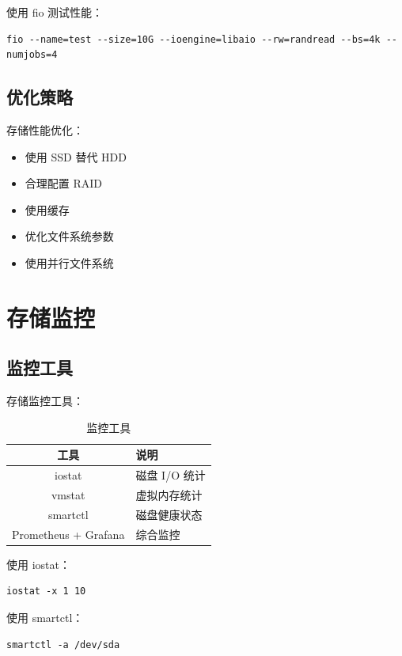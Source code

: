 \documentclass[12pt,UTF8]{ctexbook}
\begin{document}
使用 fio 测试性能：
\begin{verbatim}
fio --name=test --size=10G --ioengine=libaio --rw=randread --bs=4k --numjobs=4
\end{verbatim}

\section{优化策略}
\label{sec:optimization_strategy}

存储性能优化：
\begin{itemize}
    \item 使用 SSD 替代 HDD
    \item 合理配置 RAID
    \item 使用缓存
    \item 优化文件系统参数
    \item 使用并行文件系统
\end{itemize}

\chapter{存储监控}
\label{chap:monitoring}

\section{监控工具}
\label{sec:monitoring_tools}

存储监控工具：
\begin{table}[htbp]
    \centering
    \caption{监控工具}
    \begin{tabular}{|c|p{8cm}|}
        \hline
        \textbf{工具} & \textbf{说明} \\
        \hline
        iostat & 磁盘 I/O 统计 \\
        \hline
        vmstat & 虚拟内存统计 \\
        \hline
        smartctl & 磁盘健康状态 \\
        \hline
        Prometheus + Grafana & 综合监控 \\
        \hline
    \end{tabular}
\end{table}

使用 iostat：
\begin{verbatim}
iostat -x 1 10
\end{verbatim}

使用 smartctl：
\begin{verbatim}
smartctl -a /dev/sda
\end{verbatim}

\backmatter
\end{document}

